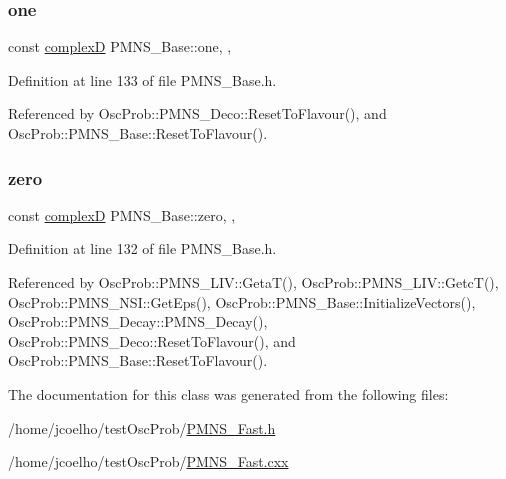 \subsubsection{\texorpdfstring{one}{one}}
{\footnotesize\ttfamily const \hyperlink{EigenPoint_8h_a67ca8e107e20610c3fff78d5e726ece0}{complexD} P\+M\+N\+S\+\_\+\+Base\+::one\hspace{0.3cm}{\ttfamily [static]}, {\ttfamily [protected]}, {\ttfamily [inherited]}}



Definition at line 133 of file P\+M\+N\+S\+\_\+\+Base.\+h.



Referenced by Osc\+Prob\+::\+P\+M\+N\+S\+\_\+\+Deco\+::\+Reset\+To\+Flavour(), and Osc\+Prob\+::\+P\+M\+N\+S\+\_\+\+Base\+::\+Reset\+To\+Flavour().

\mbox{\label{classOscProb_1_1PMNS__Base_a05e595848c2521dc795efa7645728b94}} 
\subsubsection{\texorpdfstring{zero}{zero}}
{\footnotesize\ttfamily const \hyperlink{EigenPoint_8h_a67ca8e107e20610c3fff78d5e726ece0}{complexD} P\+M\+N\+S\+\_\+\+Base\+::zero\hspace{0.3cm}{\ttfamily [static]}, {\ttfamily [protected]}, {\ttfamily [inherited]}}



Definition at line 132 of file P\+M\+N\+S\+\_\+\+Base.\+h.



Referenced by Osc\+Prob\+::\+P\+M\+N\+S\+\_\+\+L\+I\+V\+::\+Geta\+T(), Osc\+Prob\+::\+P\+M\+N\+S\+\_\+\+L\+I\+V\+::\+Getc\+T(), Osc\+Prob\+::\+P\+M\+N\+S\+\_\+\+N\+S\+I\+::\+Get\+Eps(), Osc\+Prob\+::\+P\+M\+N\+S\+\_\+\+Base\+::\+Initialize\+Vectors(), Osc\+Prob\+::\+P\+M\+N\+S\+\_\+\+Decay\+::\+P\+M\+N\+S\+\_\+\+Decay(), Osc\+Prob\+::\+P\+M\+N\+S\+\_\+\+Deco\+::\+Reset\+To\+Flavour(), and Osc\+Prob\+::\+P\+M\+N\+S\+\_\+\+Base\+::\+Reset\+To\+Flavour().



The documentation for this class was generated from the following files\+:\begin{DoxyCompactItemize}
\item 
/home/jcoelho/test\+Osc\+Prob/\hyperlink{PMNS__Fast_8h}{P\+M\+N\+S\+\_\+\+Fast.\+h}\item 
/home/jcoelho/test\+Osc\+Prob/\hyperlink{PMNS__Fast_8cxx}{P\+M\+N\+S\+\_\+\+Fast.\+cxx}\end{DoxyCompactItemize}
